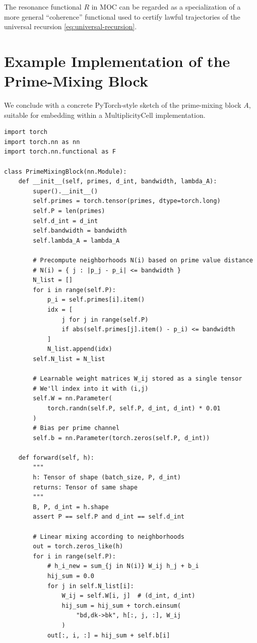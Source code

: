 \documentclass[11pt]{article}
\begin{document}
The resonance functional \(R\) in MOC can be regarded as a specialization of a
more general ``coherence'' functional used to certify lawful trajectories of
the universal recursion \eqref{eq:universal-recursion}.

\section{Example Implementation of the Prime-Mixing Block}

We conclude with a concrete PyTorch-style sketch of the prime-mixing block
\(A\), suitable for embedding within a MultiplicityCell implementation.

\begin{lstlisting}[style=pytorch, caption={Prime-mixing block $A$ in PyTorch-style pseudocode.}]
import torch
import torch.nn as nn
import torch.nn.functional as F

class PrimeMixingBlock(nn.Module):
    def __init__(self, primes, d_int, bandwidth, lambda_A):
        super().__init__()
        self.primes = torch.tensor(primes, dtype=torch.long)
        self.P = len(primes)
        self.d_int = d_int
        self.bandwidth = bandwidth
        self.lambda_A = lambda_A

        # Precompute neighborhoods N(i) based on prime value distance
        # N(i) = { j : |p_j - p_i| <= bandwidth }
        N_list = []
        for i in range(self.P):
            p_i = self.primes[i].item()
            idx = [
                j for j in range(self.P)
                if abs(self.primes[j].item() - p_i) <= bandwidth
            ]
            N_list.append(idx)
        self.N_list = N_list

        # Learnable weight matrices W_ij stored as a single tensor
        # We'll index into it with (i,j)
        self.W = nn.Parameter(
            torch.randn(self.P, self.P, d_int, d_int) * 0.01
        )
        # Bias per prime channel
        self.b = nn.Parameter(torch.zeros(self.P, d_int))

    def forward(self, h):
        """
        h: Tensor of shape (batch_size, P, d_int)
        returns: Tensor of same shape
        """
        B, P, d_int = h.shape
        assert P == self.P and d_int == self.d_int

        # Linear mixing according to neighborhoods
        out = torch.zeros_like(h)
        for i in range(self.P):
            # h_i_new = sum_{j in N(i)} W_ij h_j + b_i
            hij_sum = 0.0
            for j in self.N_list[i]:
                W_ij = self.W[i, j]  # (d_int, d_int)
                hij_sum = hij_sum + torch.einsum(
                    "bd,dk->bk", h[:, j, :], W_ij
                )
            out[:, i, :] = hij_sum + self.b[i]


\end{lstlisting}
\end{document}
